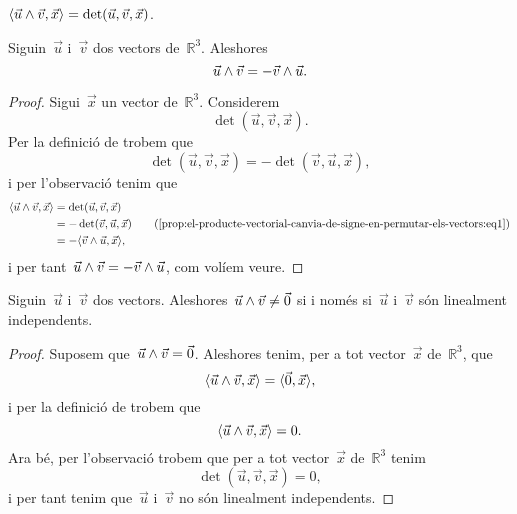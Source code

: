 \documentclass[../geometria-diferencial.tex]{subfiles}
\begin{document}
    \begin{observation}
        \label{obs:formula-del-determinant-segons-el-producte-vectorial-i-el-producte-escalar}
        \(\prodesc{\vec{u}\prodvec\vec{v}}{\vec{x}}=\det(\vec{u},\vec{v},\vec{x})\).
    \end{observation}
    \begin{proposition}
    \label{prop:el-producte-vectorial-canvia-de-signe-en-permutar-els-vectors}
        Siguin~\(\vec{u}\) i~\(\vec{v}\) dos vectors de~\(\mathbb{R}^{3}\).
        Aleshores
        \[
            \vec{u}\mathbin{\wedge}\vec{v}=-\vec{v}\mathbin{\wedge}\vec{u}.
        \]
    \end{proposition}
    \begin{proof}
        Sigui~\(\vec{x}\) un vector de~\(\mathbb{R}^{3}\).
        Considerem
        \[
            \det(\vec{u},\vec{v},\vec{x}).
        \]
        Per la definició de  trobem que %
        \begin{equation}
            \label{prop:el-producte-vectorial-canvia-de-signe-en-permutar-els-vectors:eq1}
            \det(\vec{u},\vec{v},\vec{x})=-\det(\vec{v},\vec{u},\vec{x}),
        \end{equation}
        i per l'observació  tenim que
        \begin{align*}
            \prodesc{\vec{u}\prodvec\vec{v}}{\vec{x}}&=\det(\vec{u},\vec{v},\vec{x}) \\
            &=-\det(\vec{v},\vec{u},\vec{x}) \tag{\ref{prop:el-producte-vectorial-canvia-de-signe-en-permutar-els-vectors:eq1}}\\
            &=-\prodesc{\vec{v}\prodvec\vec{u}}{\vec{x}},
        \end{align*}
        i per tant~\(\vec{u}\mathbin{\wedge}\vec{v}=-\vec{v}\mathbin{\wedge}\vec{u}\), com volíem veure.
    \end{proof}
    \begin{proposition}
        \label{prop:el-producte-vectorial-es-zero-si-i-nomes-si-els-vectors-no-son-linealment-independents}
        Siguin~\(\vec{u}\) i~\(\vec{v}\) dos vectors.
        Aleshores~\(\vec{u}\mathbin{\wedge}\vec{v}\neq\vec{0}\) si i només si~\(\vec{u}\) i~\(\vec{v}\) són linealment independents.
    \end{proposition}
    \begin{proof}
        Suposem que~\(\vec{u}\mathbin{\wedge}\vec{v}=\vec{0}\).
        Aleshores tenim, per a tot vector~\(\vec{x}\) de~\(\mathbb{R}^{3}\), que
        \[
            \prodesc{\vec{u}\prodvec\vec{v}}{\vec{x}}=\prodesc{\vec{0}}{\vec{x}},
        \]
        i per la definició de  trobem que
        \[
            \prodesc{\vec{u}\prodvec\vec{v}}{\vec{x}}=0.
        \]
        Ara bé, per l'observació  trobem que per a tot vector~\(\vec{x}\) de~\(\mathbb{R}^{3}\) tenim
        \[
            \det(\vec{u},\vec{v},\vec{x})=0,
        \]
        i per tant tenim que~\(\vec{u}\) i~\(\vec{v}\) no són linealment independents.
    \end{proof}
\end{document}
